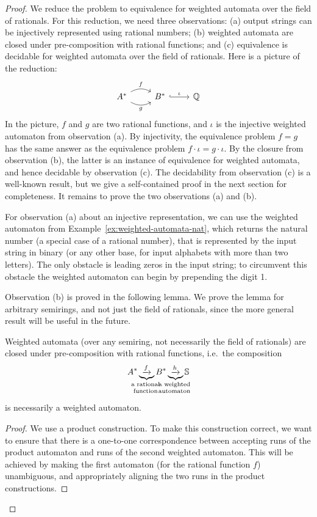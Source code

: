 \begin{proof}
    We reduce the problem to equivalence for weighted automata over the field of rationals. For this reduction, we need three observations: (a) output strings can be injectively represented using rational numbers; (b) weighted automata are closed under pre-composition with rational functions; and (c) equivalence is decidable for weighted automata over the field of rationals. Here is a picture of the reduction: 
    \[
    \begin{tikzcd}
    A^* 
    \arrow[r,"f", bend left]
    \arrow[r,"g"', bend right]
    &
    B^* 
    \arrow[r,hookrightarrow, "\iota"]
    &
    \Rat
    \end{tikzcd}
    \]
    In the picture, $f$ and $g$ are two rational functions, and $\iota$ is the injective weighted automaton from observation (a). By injectivity, the equivalence problem $f=g$ has the same answer as the equivalence problem $f \cdot \iota = g \cdot \iota$. By the closure from observation (b), the latter is an instance of equivalence for weighted automata, and hence decidable by observation (c).
    The decidability from observation (c) is a well-known result, but we give a self-contained proof in the next section for completeness.
    It remains to prove the two observations (a) and (b).

    For observation (a) about an injective representation, we can use the weighted automaton from Example~\ref{ex:weighted-automata-nat}, which returns the natural number (a special case of a rational number), that is represented by the input string in binary (or any other base, for input alphabets with more than two letters). The only obstacle is leading zeros in the input string; to circumvent this obstacle the weighted automaton can begin by prepending the digit 1. 

    Observation (b) is proved in the following lemma. We prove the lemma for arbitrary semirings, and not just the field of rationals, since the more general result will be useful in the future.
    \begin{lemma}\label{lem:closure-weighted-automata-precomposition}
        Weighted automata (over any semiring, not necessarily the field of rationals) are closed under pre-composition with rational functions, i.e.~the composition 
        \begin{align*}
        A^*
        \myunderbrace{\xrightarrow{f}}{a rational \\ function}
        B^*
        \myunderbrace{\xrightarrow{h}}{a weighted \\ automaton}
        \semiring
        \end{align*}
        is necessarily a weighted automaton.
    \end{lemma}
    \begin{proof}
        We use a product construction. To make this construction correct, we want to ensure that there is a one-to-one correspondence between accepting runs of the product automaton and runs of the second weighted automaton. This will be achieved by making the first automaton (for the rational function $f$) unambiguous, and appropriately aligning the two runs in the product constructions.


\end{proof}
\end{proof}
